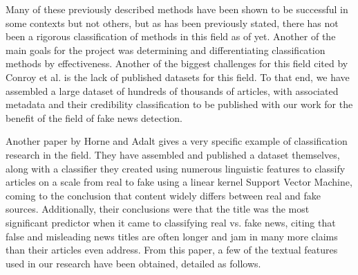 \documentclass{article}
\begin{document}
	Many of these previously described methods have been shown to be successful in some contexts but not others, but as has been previously stated, there has not been a rigorous classification of methods in this field as of yet. Another of the main goals for the project was determining and differentiating classification methods by effectiveness. Another of the biggest challenges for this field cited by Conroy et al. is the lack of published datasets for this field. To that end, we have assembled a large dataset of hundreds of thousands of articles, with associated metadata and their credibility classification to be published with our work for the benefit of the field of fake news detection. \par
	Another paper by Horne and Adalt gives a very specific example of classification research in the field. They have assembled and published a dataset themselves, along with a classifier they created using numerous linguistic features to classify articles on a scale from real to fake using a linear kernel Support Vector Machine, coming to the conclusion that content widely differs between real and fake sources. Additionally, their conclusions were that the title was the most significant predictor when it came to classifying real vs. fake news, citing that false and misleading news titles are often longer and jam in many more claims than their articles even address. From this paper, a few of the textual features used in our research have been obtained, detailed as follows. \par
\end{document}

